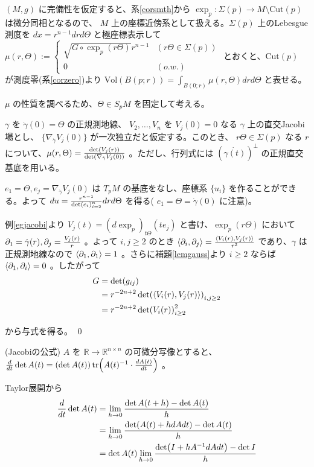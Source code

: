\documentclass[dvipdfmx,a4paper]{jsreport}
\theoremstyle{definition}
\newcommand{\der}{\partial}
\newcommand{\R}{\mathbb{R}}
\begin{document}
$(M,g)$ に完備性を仮定すると、系\ref{corsmth}から $\exp_p:\Sigma(p) \to M \setminus \mbox{Cut}(p)$ は微分同相となるので、 $M$ 上の座標近傍系として扱える。$\Sigma(p)$ 上のLebesgue測度を $dx=r^{n-1}drd\Theta$ と極座標表示して $\mu(r,\Theta):=\begin{cases}
    \sqrt{G \circ \exp_p(r\Theta)}r^{n-1} & (r\Theta \in \Sigma(p)) \\
    0 & (o.w.)
\end{cases}$ とおくと、$\mbox{Cut}(p)$ が測度零(系\ref{corzero})より $\mbox{Vol}(B(p;r))=\int_{B(0;r)} \mu(r,\Theta)drd\Theta$ と表せる。

$\mu$ の性質を調べるため、$\Theta \in S_pM$ を固定して考える。

\prop $\gamma$ を $\dot{\gamma}(0)=\Theta$ の正規測地線、 $V_2,\ldots,V_n$ を $V_j(0)=0$ なる $\gamma$ 上の直交Jacobi場とし、 $\{\nabla_{\dot{\gamma}}V_j(0)\}$ が一次独立だと仮定する。このとき、 $r\Theta \in \Sigma(p)$ なる $r$ について、$\mu(r,\Theta)={\det(V_j(r)) \over \det(\nabla_{\dot{\gamma}}V_j(0))}$ 。ただし、行列式には $(\dot{\gamma(t)})^{\bot}$ の正規直交基底を用いる。

\prf $e_1=\Theta,e_j=\nabla_{\dot{\gamma}}V_j(0)$ は $T_pM$ の基底をなし、座標系 $\{u_i\}$ を作ることができる。よって $du={r^{n-1} \over \det(e_i)_{i=2}^n}drd\Theta$ を得る( $e_1=\Theta=\dot{\gamma}(0)$ に注意)。

例\ref{egjacobi}より $V_j(t)=(d\exp_p)_{t\Theta}(te_j)$ と書け、$\exp_p(r\Theta)$ において $\der_1=\dot{\gamma}(r),\der_j={V_j(r) \over r}$ 。よって $i,j \geq 2$ のとき $\ev{\der_i,\der_j}={\ev{V_i(r),V_j(r)} \over r^2}$ であり、$\gamma$ は正規測地線なので $\ev{\der_1,\der_1}=1$ 。さらに補題\ref{lemgauss}より $i\geq 2$ ならば $\ev{\der_1,\der_i}=0$ 。したがって
\begin{align*}
    G &=\det(g_{ij}) \\
    &= r^{-2n+2}\det(\ev{V_i(r),V_j(r)})_{i,j \geq 2} \\
    &= r^{-2n+2}\det(V_i(r))_{i \geq 2}^2 \\
\end{align*}

から与式を得る。 \qed

\lem (Jacobiの公式) $A$ を $\R \to \R^{n\times n}$ の可微分写像とすると、 ${d \over dt}\det A(t)=(\det A(t))\tr(A(t)^{-1}\cdot {dA(t) \over dt})$ 。

\prf Taylor展開から
\begin{align*}
    {d \over dt}\det A(t) &= \lim_{h \to 0}{{\det A(t+h)-\det A(t)} \over h} \\
    &= \lim_{h \to 0}{{\det (A(t)+h{dA}{dt})-\det A(t)} \over h} \\
    &= \det A(t)\lim_{h \to 0}{{\det (I+hA^{-1}{dA}{dt})-\det I} \over h}
\end{align*}
\end{document}
